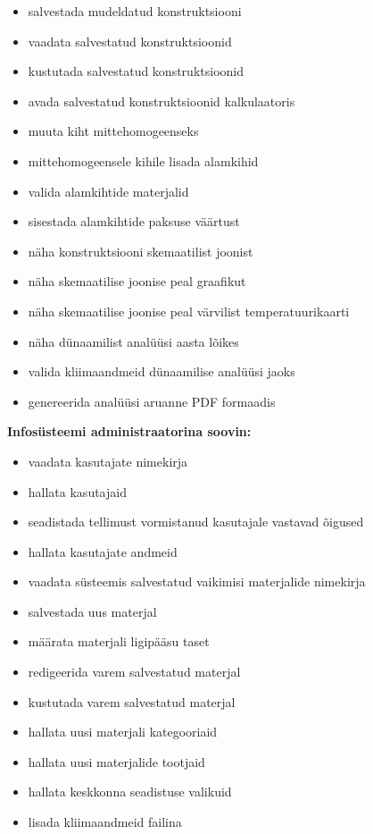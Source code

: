 \begin{itemize}
    \item salvestada mudeldatud konstruktsiooni
    \item vaadata salvestatud konstruktsioonid
    \item kustutada salvestatud konstruktsioonid
    \item avada salvestatud konstruktsioonid kalkulaatoris
    \item muuta kiht mittehomogeenseks
    \item mittehomogeensele kihile lisada alamkihid
    \item valida alamkihtide materjalid
    \item sisestada alamkihtide paksuse väärtust
    \item näha konstruktsiooni skemaatilist joonist
    \item näha skemaatilise joonise peal graafikut
    \item näha skemaatilise joonise peal värvilist temperatuurikaarti
    \item näha dünaamilist analüüsi aasta lõikes
    \item valida kliimaandmeid dünaamilise analüüsi jaoks
    \item genereerida analüüsi aruanne PDF formaadis
\end{itemize}



\textbf{Infosüsteemi administraatorina soovin:}
\begin{itemize}

    \item vaadata kasutajate nimekirja
    \item hallata kasutajaid
    \item seadistada tellimust vormistanud kasutajale vastavad õigused
    \item hallata kasutajate andmeid
    \item vaadata süsteemis salvestatud vaikimisi materjalide nimekirja
    \item salvestada uus materjal
    \item määrata materjali ligipääsu taset
    \item redigeerida varem salvestatud materjal
    \item kustutada varem salvestatud materjal
    \item hallata uusi materjali kategooriaid
    \item hallata uusi materjalide tootjaid
    \item hallata keskkonna seadistuse valikuid
    \item lisada kliimaandmeid failina
\end{itemize}

